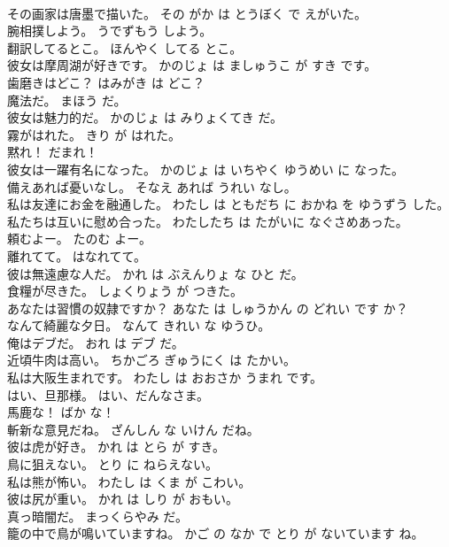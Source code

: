 \documentclass[8pt]{extreport}
\begin{document}
\begin{CJK}{UTF8}{min}
\\	その画家は唐墨で描いた。	その がか は とうぼく で えがいた。	
\\	腕相撲しよう。	うでずもう しよう。	
\\	翻訳してるとこ。	ほんやく してる とこ。	
\\	彼女は摩周湖が好きです。	かのじょ は ましゅうこ が すき です。	
\\	歯磨きはどこ？	はみがき は どこ？	
\\	魔法だ。	まほう だ。	
\\	彼女は魅力的だ。	かのじょ は みりょくてき だ。	
\\	霧がはれた。	きり が はれた。	
\\	黙れ！	だまれ！	
\\	彼女は一躍有名になった。	かのじょ は いちやく ゆうめい に なった。	
\\	備えあれば憂いなし。	そなえ あれば うれい なし。	
\\	私は友達にお金を融通した。	わたし は ともだち に おかね を ゆうずう した。	
\\	私たちは互いに慰め合った。	わたしたち は たがいに なぐさめあった。	
\\	頼むよー。	たのむ よー。	
\\	離れてて。	はなれてて。	
\\	彼は無遠慮な人だ。	かれ は ぶえんりょ な ひと だ。	
\\	食糧が尽きた。	しょくりょう が つきた。	
\\	あなたは習慣の奴隷ですか？	あなた は しゅうかん の どれい です か？	
\\	なんて綺麗な夕日。	なんて きれい な ゆうひ。	
\\	俺はデブだ。	おれ は デブ だ。	
\\	近頃牛肉は高い。	ちかごろ ぎゅうにく は たかい。	
\\	私は大阪生まれです。	わたし は おおさか うまれ です。	
\\	はい、旦那様。	はい、だんなさま。	
\\	馬鹿な！	ばか な！	
\\	斬新な意見だね。	ざんしん な いけん だね。	
\\	彼は虎が好き。	かれ は とら が すき。	
\\	鳥に狙えない。	とり に ねらえない。	
\\	私は熊が怖い。	わたし は くま が こわい。	
\\	彼は尻が重い。	かれ は しり が おもい。	
\\	真っ暗闇だ。	まっくらやみ だ。	
\\	籠の中で鳥が鳴いていますね。	かご の なか で とり が ないています ね。	

\end{CJK}
\end{document}
